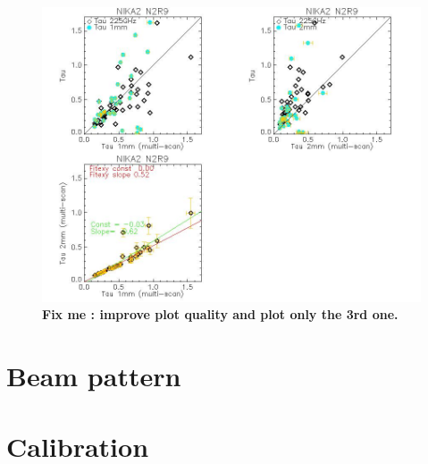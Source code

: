 \documentclass[a4paper, 11pt]{article} %
\begin{document}
\begin{figure}
\begin{center}
\includegraphics[clip, angle=0, scale = 0.5]{Figures/test_allskd_N2R9.jpg}
\caption{{\bf Fix me : improve plot quality and plot only the 3rd one.}}
\label{fig:test_allskd_N2R9}
\end{center}
\end{figure}








\section{Beam pattern}
\label{se:beams}



\section{Calibration}
\label{se:calibration}
\end{document}
